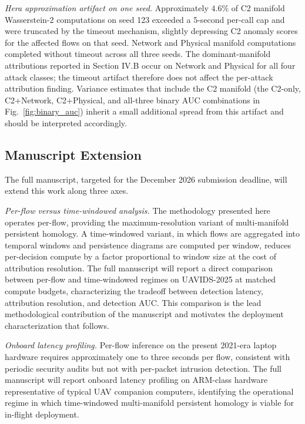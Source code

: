\documentclass[conf]{new-aiaa}
\begin{document}
\textit{Hera approximation artifact on one seed.} Approximately $4.6\%$ of C2 manifold Wasserstein-2 computations on seed 123 exceeded a 5-second per-call cap and were truncated by the timeout mechanism, slightly depressing C2 anomaly scores for the affected flows on that seed. Network and Physical manifold computations completed without timeout across all three seeds. The dominant-manifold attributions reported in Section IV.B occur on Network and Physical for all four attack classes; the timeout artifact therefore does not affect the per-attack attribution finding. Variance estimates that include the C2 manifold (the C2-only, C2+Network, C2+Physical, and all-three binary AUC combinations in Fig.~\ref{fig:binary_auc}) inherit a small additional spread from this artifact and should be interpreted accordingly.

\subsection{Manuscript Extension}

The full manuscript, targeted for the December 2026 submission deadline, will extend this work along three axes.

\textit{Per-flow versus time-windowed analysis.} The methodology presented here operates per-flow, providing the maximum-resolution variant of multi-manifold persistent homology. A time-windowed variant, in which flows are aggregated into temporal windows and persistence diagrams are computed per window, reduces per-decision compute by a factor proportional to window size at the cost of attribution resolution. The full manuscript will report a direct comparison between per-flow and time-windowed regimes on UAVIDS-2025 at matched compute budgets, characterizing the tradeoff between detection latency, attribution resolution, and detection AUC. This comparison is the lead methodological contribution of the manuscript and motivates the deployment characterization that follows.

\textit{Onboard latency profiling.} Per-flow inference on the present 2021-era laptop hardware requires approximately one to three seconds per flow, consistent with periodic security audits but not with per-packet intrusion detection. The full manuscript will report onboard latency profiling on ARM-class hardware representative of typical UAV companion computers, identifying the operational regime in which time-windowed multi-manifold persistent homology is viable for in-flight deployment.
\end{document}
